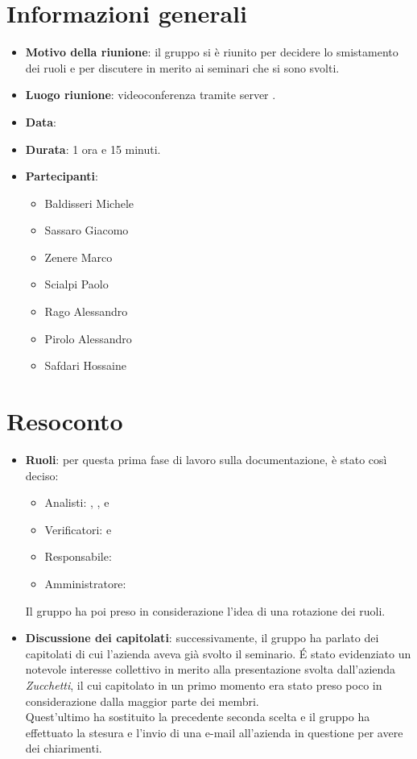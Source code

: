 \section{Informazioni generali}
\begin{itemize}
\item \textbf{Motivo della riunione}: il gruppo si è riunito per decidere lo smistamento dei ruoli e per discutere in merito ai seminari che si sono svolti.
\item \textbf{Luogo riunione}: videoconferenza tramite server .
\item \textbf{Data}: \Data{}
\item \textbf{Durata}: 1 ora e 15 minuti.
\item \textbf{Partecipanti}:
	\begin{itemize}
	\item Baldisseri Michele
	\item Sassaro Giacomo
	\item Zenere Marco
	\item Scialpi Paolo
	\item Rago Alessandro
	\item Pirolo Alessandro
	\item Safdari Hossaine
	\end{itemize}
\end{itemize}
\newpage
\section{Resoconto}
\begin{itemize}
\item \textbf{Ruoli}: per questa prima fase di lavoro sulla documentazione, è stato così deciso:
\begin{itemize}
\item Analisti: \SH{}, \ZM{}, \RA{} e \SP{}
\item Verificatori: \PA{} e \BM{} 
\item Responsabile: \SG{}
\item Amministratore: \BM{}
\end{itemize}
Il gruppo ha poi preso in considerazione l'idea di una rotazione dei ruoli.

\item \textbf{Discussione dei capitolati}: successivamente, il gruppo ha parlato dei capitolati di cui l'azienda aveva già svolto il seminario. \'E stato evidenziato un notevole interesse collettivo in merito alla presentazione svolta dall'azienda \textit{Zucchetti}, il cui capitolato in un primo momento era stato preso poco in considerazione dalla maggior parte dei membri.\\ Quest'ultimo ha sostituito la precedente seconda scelta e il gruppo ha effettuato la stesura e l'invio di una e-mail all'azienda in questione per avere dei chiarimenti.
\end{itemize}